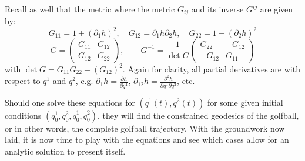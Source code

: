 Recall as well that the metric where the metric $G_{ij}$ and its inverse $G^{ij}$ are given by:
\[
G_{11} = 1 + (\partial_1 h)^2, \quad
G_{12} = \partial_1 h \partial_2 h, \quad
G_{22} = 1 + (\partial_2 h)^2
\]
\[
G = \begin{pmatrix}
G_{11} & G_{12} \\
G_{12} & G_{22}
\end{pmatrix}, \qquad
G^{-1} = \frac{1}{\det G}
\begin{pmatrix}
G_{22} & -G_{12} \\
-G_{12} & G_{11}
\end{pmatrix}
\]
with $\det G = G_{11} G_{22} - (G_{12})^2$. Again for clarity, all partial derivatives are with respect to $q^1$ and $q^2$, e.g. $\partial_1 h = \frac{\partial h}{\partial q^1}$, $\partial_{12} h = \frac{\partial^2 h}{\partial q^1 \partial q^2}$, etc. 

\vspace{1em}
Should one solve these equations for $(q^1(t),q^2(t))$ for some given initial conditions $(q^1_0,q^2_0,\dot q^1_0,\dot q^2_0)$, they will find the constrained geodesics of the golfball, or in other words, the complete golfball trajectory. With the groundwork now laid, it is now time to play with the equations and see which cases allow for an analytic solution to present itself. 

